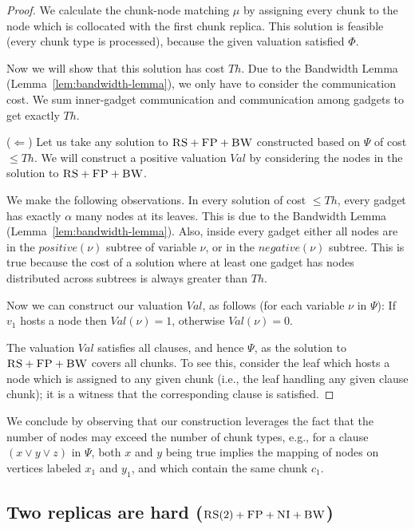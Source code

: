 \documentclass[9pt]{sigcomm-alternate}
\newcommand{\carlo}[1]{\textcolor{red}{carlo: #1}}
\newcommand{\variab}{\nu}
\newcommand{\clauses}{\alpha}
\newcommand{\CC}{\textsc{NI}}
\newcommand{\FP}{\textsc{FP}}
\newcommand{\RS}{\textsc{RS}}
\newcommand{\BW}{\textsc{BW}}
\newcommand{\Formula}{\ensuremath{\Psi}}
\newcommand{\Thr}{\ensuremath{Th}}
\newcommand{\positive}{\ensuremath{positive}}
\newcommand{\negative}{\ensuremath{negative}}
\newcommand{\Val}{\ensuremath{Val}}
\begin{document}
\begin{appendix}
\begin{proof}
We calculate the chunk-node matching $\mu$ by assigning every chunk to
the node which is collocated with the first chunk replica. This solution is feasible
(every chunk type is processed),
because the given valuation satisfied $\Phi$.

Now we will show that this solution has cost $\Thr$.
Due to the Bandwidth Lemma (Lemma~\ref{lem:bandwidth-lemma}),
we only have to consider the communication cost. We sum inner-gadget communication and communication among gadgets to get exactly $\Thr$.

($\Leftarrow$) Let us take any solution to $\RS+\FP+\BW$ constructed based on $\Formula$ of cost $\leq \Thr$.
We will construct a positive valuation $\Val$ by considering the nodes in
the solution to $\RS+\FP+\BW$.

We make the following observations. In every solution of cost
$\leq \Thr$, every gadget has exactly $\clauses$ many nodes
at its leaves. This is due to the Bandwidth Lemma (Lemma~\ref{lem:bandwidth-lemma}).
Also, inside
every gadget either all nodes are in the $\positive(\variab)$ subtree
of variable $\variab$, or in the $\negative(\variab)$ subtree. This is true
because the cost of a solution where at least one gadget has nodes
distributed across subtrees is
always greater than $\Thr$.

Now we can construct our valuation $\Val$, as follows
(for each variable $\variab$ in $\Formula$):
If $v_1$ hosts a node then $\Val(\variab) = 1$,
otherwise $\Val(\variab) = 0$.

The valuation $\Val$ satisfies all clauses, and hence $\Formula$,
as the solution to $\RS+\FP+\BW$ covers all chunks. To see this,
consider the leaf which
hosts a node which is assigned to any given chunk (i.e.,
the leaf handling any given clause chunk);
it is a witness that the corresponding clause is satisfied.
\end{proof}

We conclude by observing that our construction leverages the fact that 
the number of nodes may exceed the number of chunk types, e.g.,
for a clause $(x \vee y \vee z)$ in
$\Formula$, both $x$ and $y$ being true implies the
mapping of nodes on vertices labeled $x_1$ and $y_1$, and which contain the
same chunk $c_1$.


\subsection{Two replicas are hard
  ($\RS(2)+\FP+\CC+\BW$)}\label{ssec:two}
  

\end{appendix}
\end{document}
